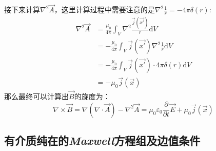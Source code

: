 \documentclass[12pt]{article}
\begin{document}
接下来计算$\nabla^2\Vec{A}$，这里计算过程中需要注意的是$\nabla^2\frac{1}{r}=-4\pi\delta(r)$:
\begin{equation}
    \begin{split}
        \nabla^2\Vec{A}&=\frac{\mu_0}{4\pi}\int_V \nabla^2\frac{\Vec{j}(\Vec{x'})}{r}\mathrm{d}V\\
        &=-\frac{\mu_0}{4\pi}\int_V \Vec{j}(\Vec{x'})\nabla^2\frac{1}{r}\mathrm{d}V\\
        &=-\frac{\mu_0}{4\pi}\int_V \Vec{j}(\Vec{x'})\cdot4\pi\delta(r)\mathrm{d}V\\
        &=-\mu_0 \Vec{j}(\Vec{x})
    \end{split}
\end{equation}
那么最终可以计算出$\Vec{B}$的旋度为：
\begin{equation}
    \nabla\times\Vec{B}=\nabla(\nabla\cdot\Vec{A})-\nabla^2\Vec{A}=\mu_0\varepsilon_0 \frac{\partial}{\partial t}\Vec{E}+\mu_0 \Vec{j}(\Vec{x})
\end{equation}
\subsection{有介质纯在的\textit{Maxwell}方程组及边值条件}
\end{document}

